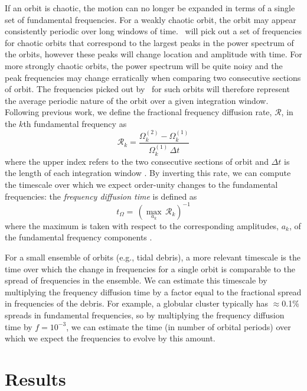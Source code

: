 If an orbit is chaotic, the motion can no longer be expanded in terms of a single set of fundamental frequencies. For a weakly chaotic orbit, the orbit may appear consistently periodic over long windows of time. \superfreq\ will pick out a set of frequencies for chaotic orbits that correspond to the largest peaks in the power spectrum of the orbits, however these peaks will change location and amplitude with time. For more strongly chaotic orbits, the power spectrum will be quite noisy and the peak frequencies may change erratically when comparing two consecutive sections of orbit. The frequencies picked out by \superfreq\ for such orbits will therefore represent the average periodic nature of the orbit over a given integration window. Following previous work, we define the fractional frequency diffusion rate, $\mathcal{R}$, in the $k$th fundamental frequency as
\begin{equation}
	\mathcal{R}_k = \frac{\Omega_{k}^{(2)} - \Omega_{k}^{(1)}}{\Omega_{k}^{(1)} \, \Delta t} \label{eq:fdrate}
\end{equation}
where the upper index refers to the two consecutive sections of orbit and $\Delta t$ is the length of each integration window \citep{laskar93, valluri98, valluri12}. By inverting this rate, we can compute the timescale over which we expect order-unity changes to the fundamental frequencies: the \emph{frequency diffusion time} is defined as
\begin{equation}
	t_\Omega = \, (\max_{a_k} \, \mathcal{R}_k)^{-1} \label{eq:fdtime}
\end{equation}
where the maximum is taken with respect to the corresponding amplitudes, $a_k$, of the fundamental frequency components \citep[see][]{valluri12}.

For a small ensemble of orbits (e.g., tidal debris), a more relevant timescale is the time over which the change in frequencies for a single orbit is comparable to the spread of frequencies in the ensemble. We can estimate this timescale by multiplying the frequency diffusion time by a factor equal to the fractional spread in frequencies of the debris. For example, a globular cluster typically has $\approx$0.1\% spreads in fundamental frequencies, so by multiplying the frequency diffusion time by $f = 10^{-3}$, we can estimate the time (in number of orbital periods) over which we expect the frequencies to evolve by this amount.

%
\section{Results}

